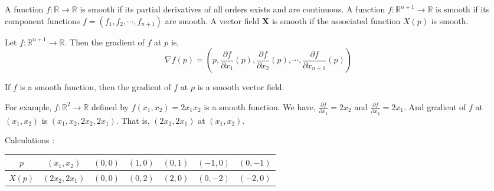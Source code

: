 \begin{definition}[smooth]
	A function $f : \mathbb{R} \to \mathbb{R}$ is smooth if its partial derivatives of all orders exists and are continuous.
	A function $f : \mathbb{R}^{n+1} \to \mathbb{R}$ is smooth if its component functions $f = (f_1, f_2, \cdots, f_{n+1})$ are smooth.
	A vector field $\mathbf{X}$ is smooth if the associated function $X(p)$ is smooth.
\end{definition}

\begin{definition}
	Let $f : \mathbb{R}^{n+1} \to \mathbb{R}$. Then the gradient of $f$ at $p$ is,
	\begin{equation}
		\nabla f(p) = \left(p,\frac{\partial f}{\partial x_1}(p),\frac{\partial f}{\partial x_2}(p),\cdots,\frac{\partial f}{\partial x_{n+1}}(p)\right)
	\end{equation}
\end{definition}

\begin{remark}
	If $f$ is a smooth function, then the gradient of $f$ at $p$ is a smooth vector field.
\end{remark}
	For example, $f : \mathbb{R}^2 \to \mathbb{R}$ defined by $f(x_1,x_2) = 2x_1x_2$ is a smooth function. We have, $\frac{\partial f}{\partial x_1} = 2x_2$ and $\frac{\partial f}{\partial x_2} = 2x_1$. And gradient of $f$ at $(x_1,x_2)$ is $(x_1,x_2,2x_2,2x_1)$. That is, $(2x_2,2x_1)$ at $(x_1,x_2)$.

Calculations : \\
\begin{tabular}{|c|c|c|c|c|c|c|} \hline
	$p$    & $(x_1,x_2)$   & $(0,0)$ & $(1,0)$ & $(0,1)$ & $(-1,0)$ & $(0,-1)$ \\ \hline
	$X(p)$ & $(2x_2,2x_1)$ & $(0,0)$ & $(0,2)$ & $(2,0)$ & $(0,-2)$ & $(-2,0)$ \\ \hline
\end{tabular}

